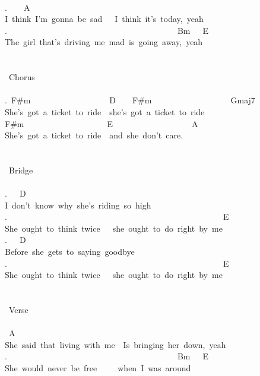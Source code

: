 {\\
.\ \ \ \ A\\
I\ think\ I'm\ gonna\ be\ sad\ \ \ I\ think\ it's\ today,\ yeah\\
.\ \ \ \ \ \ \ \ \ \ \ \ \ \ \ \ \ \ \ \ \ \ \ \ \ \ \ \ \ \ \ \ \ \ \ \ \ \ \ \ \ Bm\ \ \ E\\
The\ girl\ that's\ driving\ me\ mad\ is\ going\ away,\ yeah\\
\\
\\
\lbrack\ Chorus\rbrack\\
\\
.\ F\#m\ \ \ \ \ \ \ \ \ \ \ \ \ \ \ \ \ \ \ D\ \ \ \ F\#m\ \ \ \ \ \ \ \ \ \ \ \ \ \ \ \ \ \ \ Gmaj7\\
She's\ got\ a\ ticket\ to\ ride\ \ she's\ got\ a\ ticket\ to\ ride\\
F\#m\ \ \ \ \ \ \ \ \ \ \ \ \ \ \ \ \ \ \ \ E\ \ \ \ \ \ \ \ \ \ \ \ \ \ \ \ \ \ \ A\\
She's\ got\ a\ ticket\ to\ ride\ \ and\ she\ don't\ care.\\
\\
\\
\lbrack\ Bridge\rbrack\\
\\
.\ \ \ D\\
I\ don't\ know\ why\ she's\ riding\ so\ high\\
.\ \ \ \ \ \ \ \ \ \ \ \ \ \ \ \ \ \ \ \ \ \ \ \ \ \ \ \ \ \ \ \ \ \ \ \ \ \ \ \ \ \ \ \ \ \ \ \ \ \ \ \ E\\
She\ ought\ to\ think\ twice\ \ \ she\ ought\ to\ do\ right\ by\ me\\
.\ \ \ D\\
Before\ she\ gets\ to\ saying\ goodbye\\
.\ \ \ \ \ \ \ \ \ \ \ \ \ \ \ \ \ \ \ \ \ \ \ \ \ \ \ \ \ \ \ \ \ \ \ \ \ \ \ \ \ \ \ \ \ \ \ \ \ \ \ \ E\\
She\ ought\ to\ think\ twice\ \ \ she\ ought\ to\ do\ right\ by\ me\\
\\
\\
\lbrack\ Verse\rbrack\\
\\
\ A\\
She\ said\ that\ living\ with\ me\ \ Is\ bringing\ her\ down,\ yeah\\
.\ \ \ \ \ \ \ \ \ \ \ \ \ \ \ \ \ \ \ \ \ \ \ \ \ \ \ \ \ \ \ \ \ \ \ \ \ \ \ \ \ Bm\ \ \ E\\
She\ would\ never\ be\ free\ \ \ \ \ when\ I\ was\ around\\
}
